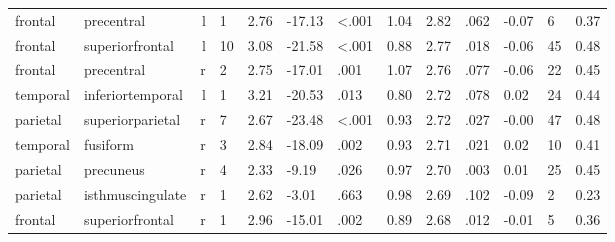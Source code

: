 \documentclass{article}
\begin{document}
\begin{longtable}{llrR{1.3cm}R{1cm}R{1.3cm}R{1cm}R{1cm}R{1.3cm}R{1cm}R{1.8cm}R{1.3cm}R{1.8cm}}
   frontal &                precentral &    l &         1 &                  2.76 &           -17.13 &      \textless.001 &                               1.04 &                          2.82 &                            .062 &  -0.07 &      6 &      0.37 \\
   frontal &           superiorfrontal &    l &        10 &                  3.08 &           -21.58 &      \textless.001 &                               0.88 &                          2.77 &                            .018 &  -0.06 &     45 &      0.48 \\
   frontal &                precentral &    r &         2 &                  2.75 &           -17.01 &               .001 &                               1.07 &                          2.76 &                            .077 &  -0.06 &     22 &      0.45 \\
  temporal &          inferiortemporal &    l &         1 &                  3.21 &           -20.53 &               .013 &                               0.80 &                          2.72 &                            .078 &   0.02 &     24 &      0.44 \\
  parietal &          superiorparietal &    r &         7 &                  2.67 &           -23.48 &      \textless.001 &                               0.93 &                          2.72 &                            .027 &  -0.00 &     47 &      0.48 \\
  temporal &                  fusiform &    r &         3 &                  2.84 &           -18.09 &               .002 &                               0.93 &                          2.71 &                            .021 &   0.02 &     10 &      0.41 \\
  parietal &                 precuneus &    r &         4 &                  2.33 &            -9.19 &               .026 &                               0.97 &                          2.70 &                            .003 &   0.01 &     25 &      0.45 \\
  parietal &          isthmuscingulate &    r &         1 &                  2.62 &            -3.01 &               .663 &                               0.98 &                          2.69 &                            .102 &  -0.09 &      2 &      0.23 \\
   frontal &           superiorfrontal &    r &         1 &                  2.96 &           -15.01 &               .002 &                               0.89 &                          2.68 &                            .012 &  -0.01 &      5 &      0.36 \\

\end{longtable}
\end{document}
